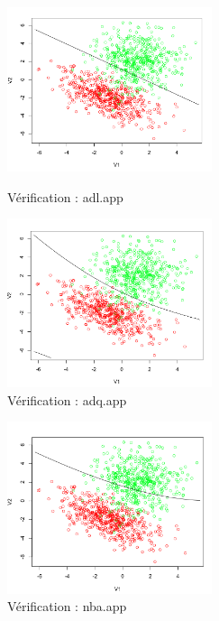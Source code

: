 \documentclass{article}
\begin{document}
\begin{figure}[H]   
  \begin{minipage}[t]{0.5\linewidth} 
    \centering   
    \includegraphics[width=6cm]{img/adl.png}   
    \caption{Vérification : adl.app}   
    \label{veri_adl}   
  \end{minipage}%
  \begin{minipage}[t]{0.5\linewidth}   
    \centering   
    \includegraphics[width=6cm]{img/adq.png}   
    \caption{Vérification : adq.app}   
    \label{veri_adq}   
  \end{minipage}   
\end{figure}
\begin{figure}[H]
\centering
\includegraphics[width=6cm]{img/nba.png}
\caption{Vérification : nba.app}
\end{figure}
\end{document}
